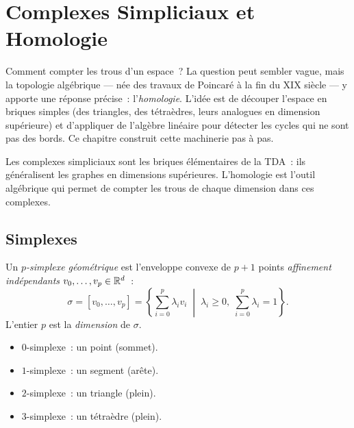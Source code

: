 \chapter{Complexes Simpliciaux et Homologie}
\label{ch:simpliciaux}

Comment compter les \og trous\fg{} d'un espace~? La question peut sembler
vague, mais la topologie alg\'ebrique --- n\'ee des travaux de Poincar\'e \`a
la fin du XIX\ieme{} si\`ecle --- y apporte une r\'eponse pr\'ecise~:
l'\emph{homologie}. L'id\'ee est de d\'ecouper l'espace en briques simples
(des triangles, des t\'etra\`edres, leurs analogues en dimension sup\'erieure)
et d'appliquer de l'alg\`ebre lin\'eaire pour d\'etecter les cycles qui ne
sont pas des bords. Ce chapitre construit cette machinerie pas \`a pas.

\begin{intuition}
Les complexes simpliciaux sont les briques \'el\'ementaires de la TDA~:
ils g\'en\'eralisent les graphes en dimensions sup\'erieures.
L'homologie est l'outil alg\'ebrique qui permet de compter les trous
de chaque dimension dans ces complexes.
\end{intuition}

\section{Simplexes}

\begin{definition}
Un \emph{$p$-simplexe g\'eom\'etrique} est l'enveloppe convexe de
$p+1$ points \emph{affinement ind\'ependants}
$v_0, \ldots, v_p \in \mathbb{R}^d$~:
\[
  \sigma = [v_0, \ldots, v_p]
  = \left\{ \sum_{i=0}^{p} \lambda_i v_i
    \;\middle|\;
    \lambda_i \geq 0,\; \sum_{i=0}^{p} \lambda_i = 1 \right\}.
\]
L'entier $p$ est la \emph{dimension} de $\sigma$.
\end{definition}

\begin{exemple}
\begin{itemize}
  \item $0$-simplexe~: un point (sommet).
  \item $1$-simplexe~: un segment (ar\^ete).
  \item $2$-simplexe~: un triangle (plein).
  \item $3$-simplexe~: un t\'etra\`edre (plein).
\end{itemize}
\end{exemple}

